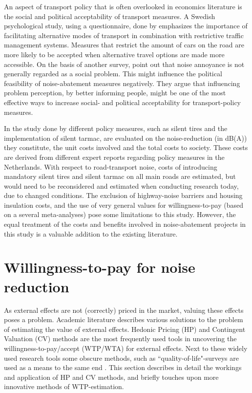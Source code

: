 \documentclass[a4paper]{scrartcl}
\begin{document}
An aspect of transport policy that is often overlooked in economics literature is the social and political acceptability of transport measures. A Swedish psychological study, using a questionnaire, done by \cite{Eriksson2008} emphasizes the importance of facilitating alternative modes of transport in combination with restrictive traffic management systems. Measures that restrict the amount of cars on the road are more likely to be accepted when alternative travel options are made more accessible. On the basis of another survey, \cite{Rienstra1999} point out that noise annoyance is not generally regarded as a social problem. This might influence the political feasibility of noise-abatement measures negatively. They argue that influencing problem perception, by better informing people, might be one of the most effective ways to increase social- and political acceptability for transport-policy measures.
	
In the study done by \cite{Nijland2003} different policy measures, such as silent tires and the implementation of silent tarmac, are evaluated on the noise-reduction (in dB(A)) they constitute, the unit costs involved and the total costs to society. These costs are derived from different expert reports regarding policy measures in the Netherlands. With respect to road-transport noise, costs of introducing mandatory silent tires and silent tarmac on all main roads are estimated, but would need to be reconsidered and estimated when conducting research today, due to changed conditions.  The exclusion of highway-noise barriers and housing insulation costs, and the use of very general values for willingness-to-pay (based on a several meta-analyses) pose some limitations to this study. However, the equal treatment of the costs and benefits involved in noise-abatement projects in this study is a valuable addition to the existing literature.

\section{Willingness-to-pay for noise reduction}

As external effects are not (correctly) priced in the market, valuing these effects poses a problem. Academic literature describes various solutions to the problem of estimating the value of external effects. Hedonic Pricing (HP) and Contingent Valuation (CV) methods are the most frequently used tools in uncovering the willingness-to-pay/accept (WTP/WTA) for external effects. Next to these widely used research tools some obscure methods, such as ``quality-of-life"-surveys are used as a means to the same end \citep{VanPraag2005}. This section describes in detail the workings and application of HP and CV methods, and briefly touches upon more innovative methods of WTP-estimation.
\end{document}
